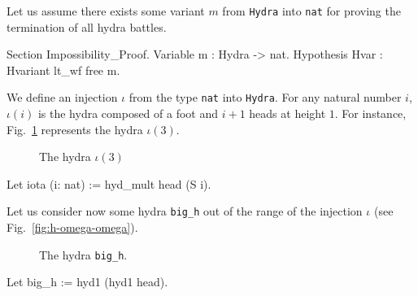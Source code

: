 

Let us assume there exists some variant $m$ from \texttt{Hydra} into \texttt{nat} for proving
    the  termination of all hydra battles.

\begin{Coqsrc}
Section Impossibility_Proof.
 Variable m : Hydra -> nat.
 Hypothesis Hvar : Hvariant lt_wf free m.
\end{Coqsrc}

We define an injection $\iota$ from the type \texttt{nat} into \texttt{Hydra}.
For any natural number $i$, $\iota(i)$ is the hydra composed of a foot and
$i+1$ heads at height $1$. For instance, Fig.~\ref{fig:flower} represents the hydra $\iota(3)$.

\begin{figure}[htb]
\centering
{}
\caption{\label{fig:flower}
The hydra $\iota(3)$}
\end{figure}

  \begin{Coqsrc}
  Let iota (i: nat) := hyd_mult head (S i).    
  \end{Coqsrc}

Let us consider now some hydra \texttt{big\_h} out of the range of the injection $\iota$ (see Fig.~\vref{fig:h-omega-omega}).

\begin{figure}[htb]
\centering
{}
\caption{\label{fig:h-omega-omega}}
 The hydra \texttt{big\_h}.
\end{figure}

 \begin{Coqsrc}
  Let big_h := hyd1 (hyd1 head).
 \end{Coqsrc}


